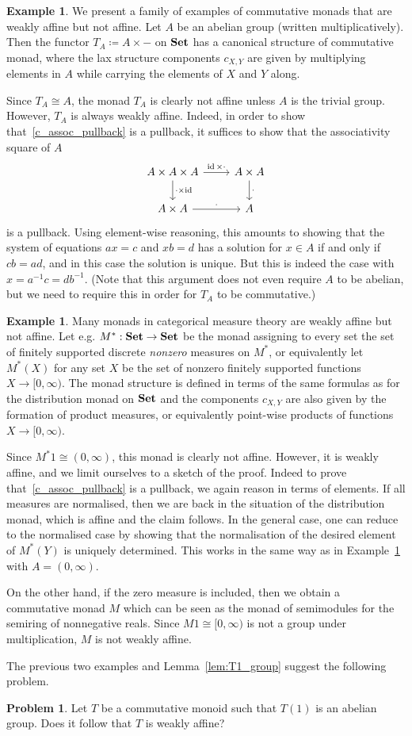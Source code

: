 \documentclass[a4paper,UKenglish,numberwithinsect,cleveref, autoref, thm-restate]{lipics-v2021}
\theoremstyle{plain} %
\theoremstyle{definition} %
\newtheorem{myproblem}[mytheorem]{Problem}
\newtheorem{myexample}[mytheorem]{Example}
\begin{document}
\begin{myexample}
	\label{ex:abelian_group}
	We present a family of examples of commutative monads that are weakly affine but not affine.
	Let $A$ be an abelian group (written multiplicatively).
	Then the functor $T_A \coloneqq A \times -$ on $\mathbf{Set}$ has a canonical structure of commutative monad, 
	where the lax structure components $c_{X,Y}$ are given by multiplying elements in $A$ while carrying the elements 
	of $X$ and $Y$ along.

	Since $T_A \cong A$, the monad $T_A$ is clearly not affine unless $A$ is the trivial group.
	However, $T_A$ is always weakly affine.
	Indeed, in order to show that~\eqref{c_assoc_pullback} is a pullback, it suffices to show that the associativity square of $A$
	\[
		\begin{tikzcd}
			A \times A \times A \ar{r}{\id \times \cdot} \ar{d}{\cdot \times \id}		& A \times A \ar{d}{\cdot}	\\
			A \times A \ar{r}{\cdot}							& A
		\end{tikzcd}
	\]
	is a pullback.
	Using element-wise reasoning, this amounts to showing that the system of equations
		$ax = c$ and $xb = d$
	has a solution for $x \in A$ if and only if $cb = ad$, and in this case the solution is unique.
	But this is indeed the case with $x = a^{-1} c = db^{-1}$.
	(Note that this argument does not even require $A$ to be abelian, but we need to require this in order for $T_A$ to be commutative.)
\end{myexample}

\begin{myexample}
	Many monads in categorical measure theory are weakly affine but not affine.
	Let e.g. $M^* : \mathbf{Set} \to \mathbf{Set}$ be the monad assigning to every set the set of finitely supported discrete \emph{nonzero}
	measures on $M^*$, or equivalently let $M^*(X)$ for any set $X$ be the set of nonzero finitely supported functions $X \to [0,\infty)$.
	The monad structure is defined in terms of the same formulas as for the distribution monad on $\mathbf{Set}$ and the
	components $c_{X,Y}$ are also given by the formation of product measures, or equivalently point-wise products of functions 
	$X \to [0,\infty)$.

	Since $M^* 1 \cong (0,\infty)$, this monad is clearly not affine.
	However, it is weakly affine, and we limit ourselves to a sketch of the proof.
	Indeed to prove that~\eqref{c_assoc_pullback} is a pullback, we again reason in terms of elements.
	If all measures are normalised, then we are back in the situation of the distribution monad, which is affine and the claim follows.
	In the general case, one can reduce to the normalised case by showing that the normalisation of the desired element of $M^*(Y)$ is uniquely determined.
	This works in the same way as in Example~\ref{ex:abelian_group} with $A = (0,\infty)$.

	On the other hand, if the zero measure is included, then we obtain a commutative monad $M$ which can be seen as the monad of semimodules for the semiring of nonnegative reals.
	Since $M1 \cong [0,\infty)$ is not a group under multiplication, $M$ is not weakly affine.
\end{myexample}

The previous two examples and Lemma~\ref{lem:T1_group} suggest the following problem.

\begin{myproblem}
	Let $T$ be a commutative monoid such that $T(1)$ is an abelian group. Does it follow that $T$ is weakly affine?
\end{myproblem}
\end{document}
